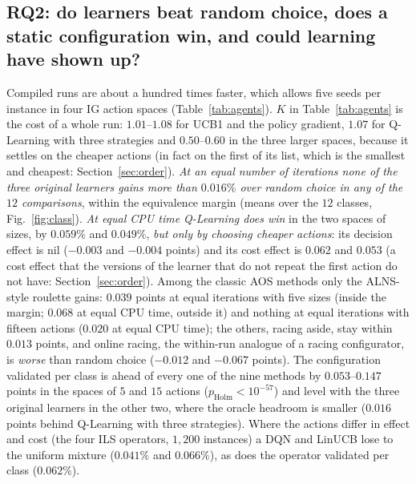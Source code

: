 \subsection{RQ2: do learners beat random choice, does a static configuration win, and could learning have shown up?}
\label{sec:rq2}
Compiled runs are about a hundred times faster, which allows five seeds per instance in four IG action spaces (Table~\ref{tab:agents}). $K$ in Table~\ref{tab:agents} is the cost of a whole run: $1.01$--$1.08$ for UCB1 and the policy gradient, $1.07$ for Q-Learning with three strategies and $0.50$--$0.60$ in the three larger spaces, because it settles on the cheaper actions (in fact on the first of its list, which is the smallest and cheapest: Section~\ref{sec:order}). \emph{At an equal number of iterations none of the three original learners gains more than $0.016\%$ over random choice in any of the $12$ comparisons}, within the equivalence margin (means over the $12$ classes, Fig.~\ref{fig:class}). \emph{At equal CPU time Q-Learning does win} in the two spaces of sizes, by $0.059\%$ and $0.049\%$, \emph{but only by choosing cheaper actions}: its decision effect is nil ($-0.003$ and $-0.004$ points) and its cost effect is $0.062$ and $0.053$ (a cost effect that the versions of the learner that do not repeat the first action do not have: Section~\ref{sec:order}). Among the classic AOS methods only the ALNS-style roulette gains: $0.039$ points at equal iterations with five sizes (inside the margin; $0.068$ at equal CPU time, outside it) and nothing at equal iterations with fifteen actions ($0.020$ at equal CPU time); the others, racing aside, stay within $0.013$ points, and online racing, the within-run analogue of a racing configurator, is \emph{worse} than random choice ($-0.012$ and $-0.067$ points). The configuration validated per class is ahead of every one of the nine methods by $0.053$--$0.147$ points in the spaces of $5$ and $15$ actions ($p_{\mathrm{Holm}}<10^{-57}$) and level with the three original learners in the other two, where the oracle headroom is smaller ($0.016$ points behind Q-Learning with three strategies). Where the actions differ in effect and cost (the four ILS operators, $1{,}200$ instances) a DQN and LinUCB lose to the uniform mixture ($0.041\%$ and $0.066\%$), as does the operator validated per class ($0.062\%$).



